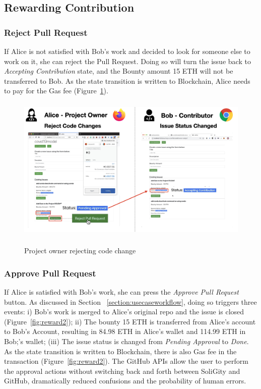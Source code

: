 \documentclass[12pt]{article}
\renewcommand{\_}{\kern-1.5pt\textunderscore\kern-1.5pt}
\begin{document}
\subsection{Rewarding Contribution}
\subsubsection{Reject Pull Request}
If Alice is not satisfied with Bob's work and decided to look for someone else to work on it, she can reject the Pull Request. Doing so will turn the issue back to \textit{Accepting Contribution} state, and the Bounty amount 15 ETH will not be transferred to Bob. As the state transition is written to Blockchain, Alice needs to pay for the Gas fee (Figure~\ref{fig:reward1}). 

\begin{figure}[H]
	\centering
	\includegraphics[height=7cm]{graphs/54. reward_1.png}\\
	\caption{Project owner rejecting code change}
	\label{fig:reward1}
\end{figure}

\subsubsection{Approve Pull Request}
If Alice is satisfied with Bob's work, she can press the \textit{Approve Pull Request} button. As discussed in Section ~\ref{section:usecaseworkflow}, doing so triggers three events: i) Bob's work is merged to Alice's original repo and the issue is closed (Figure~\ref{fig:reward2}); ii) The bounty 15 ETH is transferred from Alice's account to Bob's Account, resulting in 84.98 ETH in Alice's wallet and 114.99 ETH in Bob;'s wallet; (iii) The issue status is changed from \textit{Pending Approval} to \textit{Done}. As the state transition is written to Blockchain, there is also Gas fee in the transaction (Figure~\ref{fig:reward2}). The GitHub APIs allow the user to perform the approval actions without switching back and forth between SoliGity and GitHub, dramatically reduced confusions and the probability of human errors.    
\end{document}
